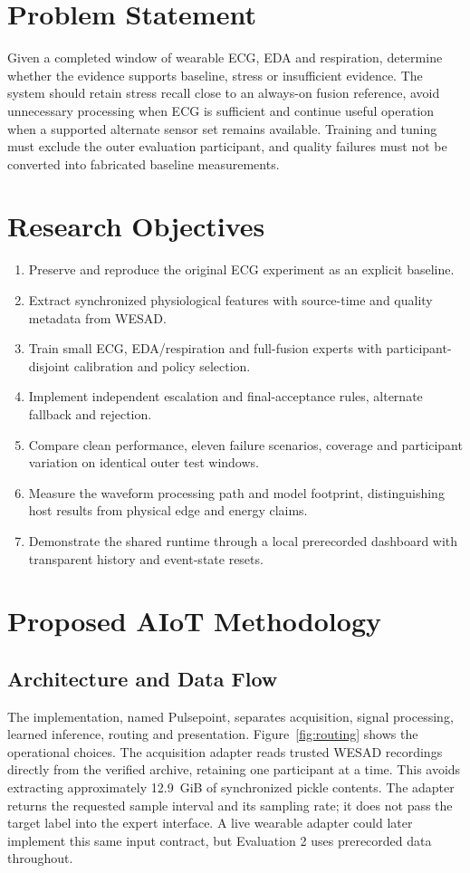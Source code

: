 \documentclass[conference,a4paper]{IEEEtran}
\newcommand{\system}{Pulsepoint}
\begin{document}
\section{Problem Statement}
Given a completed window of wearable ECG, EDA and respiration, determine whether the evidence supports baseline, stress or insufficient evidence. The system should retain stress recall close to an always-on fusion reference, avoid unnecessary processing when ECG is sufficient and continue useful operation when a supported alternate sensor set remains available. Training and tuning must exclude the outer evaluation participant, and quality failures must not be converted into fabricated baseline measurements.

\section{Research Objectives}
\begin{enumerate}
\item Preserve and reproduce the original ECG experiment as an explicit baseline.
\item Extract synchronized physiological features with source-time and quality metadata from WESAD.
\item Train small ECG, EDA/respiration and full-fusion experts with participant-disjoint calibration and policy selection.
\item Implement independent escalation and final-acceptance rules, alternate fallback and rejection.
\item Compare clean performance, eleven failure scenarios, coverage and participant variation on identical outer test windows.
\item Measure the waveform processing path and model footprint, distinguishing host results from physical edge and energy claims.
\item Demonstrate the shared runtime through a local prerecorded dashboard with transparent history and event-state resets.
\end{enumerate}

\section{Proposed AIoT Methodology}
\subsection{Architecture and Data Flow}
The implementation, named \system, separates acquisition, signal processing, learned inference, routing and presentation. Figure~\ref{fig:routing} shows the operational choices. The acquisition adapter reads trusted WESAD recordings directly from the verified archive, retaining one participant at a time. This avoids extracting approximately 12.9~GiB of synchronized pickle contents. The adapter returns the requested sample interval and its sampling rate; it does not pass the target label into the expert interface. A live wearable adapter could later implement this same input contract, but Evaluation 2 uses prerecorded data throughout.
\end{document}
